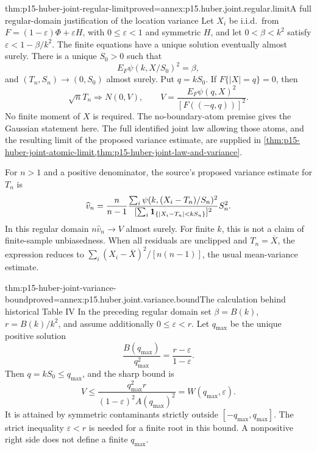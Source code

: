 \begin{hbtheorem}{thm:p15-huber-joint-regular-limit}{proved=annex:p15.huber.joint.regular.limit}{A full regular-domain justification of the location variance}
Let \(X_i\) be i.i.d.\ from
\(F=(1-\varepsilon)\Phi+\varepsilon H\), with \(0\leq\varepsilon<1\)
and symmetric \(H\),
and let \(0<\beta<k^2\) satisfy
\(\varepsilon<1-\beta/k^2\).
The finite equations have a unique solution eventually almost surely.
There is a unique \(S_0>0\) such that
\[
 E_F\psi(k,X/S_0)^2=\beta,
\]
and \((T_n,S_n)\to(0,S_0)\) almost surely.
Put \(q=kS_0\). If \(F\{|X|=q\}=0\), then
\[
 \sqrt n T_n\Longrightarrow N(0,V),\qquad
 V=\frac{E_F\psi(q,X)^2}{[F((-q,q))]^2}.
\]
No finite moment of \(X\) is required.
The no-boundary-atom premise gives the Gaussian statement here.
The full identified joint law allowing those atoms, and the resulting
limit of the proposed variance estimate, are supplied in
\cref{thm:p15-huber-joint-atomic-limit,thm:p15-huber-joint-law-and-variance}.

For \(n>1\) and a positive denominator, the source's proposed
variance estimate for \(T_n\) is
\[
 \widehat v_n=
 \frac n{n-1}
 \frac{\sum_i\psi(k,(X_i-T_n)/S_n)^2}
      {[\sum_i{\bf1}_{\{|X_i-T_n|<kS_n\}}]^2}S_n^2 .
\]
In this regular domain \(n\widehat v_n\to V\) almost surely.
For finite \(k\), this is not a claim of finite-sample unbiasedness.
When all residuals are unclipped and \(T_n=\overline X\),
the expression reduces to
\(\sum_i(X_i-\overline X)^2/[n(n-1)]\), the usual mean-variance
estimate.
\end{hbtheorem}

\begin{hbtheorem}{thm:p15-huber-joint-variance-bound}{proved=annex:p15.huber.joint.variance.bound}{The calculation behind historical Table IV}
In the preceding regular domain set \(\beta=B(k)\),
\(r=B(k)/k^2\), and assume additionally \(0\leq\varepsilon<r\).
Let \(q_{\max}\) be the unique positive solution
\[
 \frac{B(q_{\max})}{q_{\max}^2}
                  =\frac{r-\varepsilon}{1-\varepsilon}.
\]
Then \(q=kS_0\leq q_{\max}\), and the sharp bound is
\[
 V\leq
 \frac{q_{\max}^2r}{(1-\varepsilon)^2A(q_{\max})^2}
 =W(q_{\max},\varepsilon).
\]
It is attained by symmetric contaminants strictly outside
\([-q_{\max},q_{\max}]\).
The strict inequality \(\varepsilon<r\) is needed for a finite
root in this bound. A nonpositive right side does not define a
finite \(q_{\max}\).
\end{hbtheorem}

